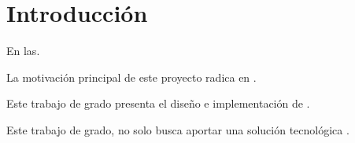\section{Introducción}


En las.\hfill \break

La motivación principal de este proyecto radica en .\hfill \break

Este trabajo de grado presenta el diseño e implementación de .\hfill \break

Este trabajo de grado, no solo busca aportar una solución tecnológica .\hfill \break

